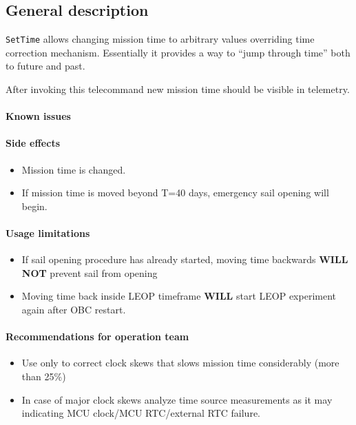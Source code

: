 

\subsection{General description}
\texttt{SetTime} allows changing mission time to arbitrary values overriding time correction mechanism. Essentially it provides a way to ``jump through time'' both to future and past.

After invoking this telecommand new mission time should be visible in telemetry.

\paragraph{Known issues} \mbox{} \None

\paragraph{Side effects}
\begin{itemize}
	\item Mission time is changed.
	\item If mission time is moved beyond T=40 days, emergency sail opening will begin.
\end{itemize}

\paragraph{Usage limitations}
\begin{itemize}
	\item If sail opening procedure has already started, moving time backwards \textbf{WILL NOT} prevent sail from opening
	\item Moving time back inside LEOP timeframe \textbf{WILL} start LEOP experiment again after OBC restart.
\end{itemize}

\paragraph{Recommendations for operation team}
\begin{itemize}
	\item Use only to correct clock skews that slows mission time considerably (more than 25\%)
	\item In case of major clock skews analyze time source measurements as it may indicating MCU clock/MCU RTC/external RTC failure.
\end{itemize}


